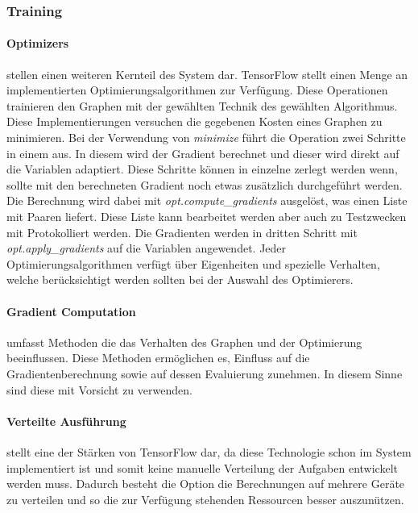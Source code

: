 \subsubsection{Training}

\paragraph{Optimizers} stellen einen weiteren Kernteil des System dar. 
TensorFlow stellt einen Menge an implementierten Optimierungsalgorithmen zur Verfügung. 
Diese Operationen trainieren den Graphen mit der gewählten Technik des gewählten Algorithmus. 
Diese Implementierungen versuchen die gegebenen Kosten eines Graphen zu minimieren. 
Bei der Verwendung von \textit{minimize} führt die Operation zwei Schritte in einem aus. 
In diesem wird der Gradient berechnet und dieser wird direkt auf die Variablen adaptiert. 
Diese Schritte können in einzelne zerlegt werden wenn, sollte mit den berechneten Gradient noch etwas zusätzlich durchgeführt werden. 
Die Berechnung wird dabei mit \textit{opt.compute\_gradients} ausgelöst, was einen Liste mit Paaren liefert. 
Diese Liste kann bearbeitet werden aber auch zu Testzwecken mit Protokolliert werden. 
Die Gradienten werden in dritten Schritt mit \textit{opt.apply\_gradients} auf die Variablen angewendet. 
Jeder Optimierungsalgorithmen verfügt über Eigenheiten und spezielle Verhalten, welche berücksichtigt werden sollten bei der Auswahl des Optimierers.

\paragraph{Gradient Computation} umfasst Methoden die das Verhalten des Graphen und der Optimierung beeinflussen. 
Diese Methoden ermöglichen es, Einfluss auf die Gradientenberechnung sowie auf dessen Evaluierung zunehmen. 
In diesem Sinne sind diese mit Vorsicht zu verwenden.

\paragraph{Verteilte Ausführung} stellt eine der Stärken von TensorFlow dar, da diese Technologie schon im System implementiert ist und somit keine manuelle Verteilung der Aufgaben entwickelt werden muss.
Dadurch besteht die Option die Berechnungen auf mehrere Geräte zu verteilen und so die zur Verfügung stehenden Ressourcen besser auszunützen. \\

